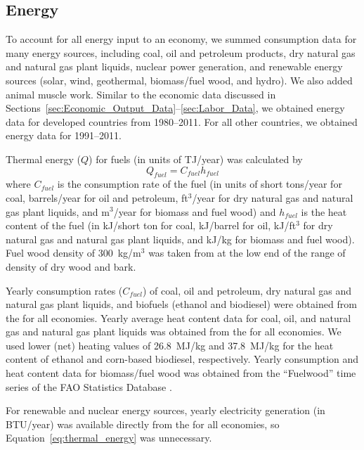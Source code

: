 \documentclass[preprint,authoryear,12pt]{elsarticle}\usepackage[]{graphicx}\usepackage[]{color}
\begin{document}
\subsection{Energy} 
\label{sec:Energy_Data}

To account for all energy input to an economy, we summed consumption data 
for many energy sources, including coal, oil and petroleum products, 
dry natural gas and natural gas plant liquids, nuclear power generation, 
and renewable energy sources (solar, wind, geothermal, biomass/fuel wood, 
and hydro). 
We also added animal muscle work. 
Similar to the economic data discussed in 
Sections~\ref{sec:Economic_Output_Data}--\ref{sec:Labor_Data}, 
we obtained energy data for developed countries from 1980--2011. 
For all other countries, 
we obtained energy data for 1991--2011. 

Thermal energy ($Q$) for fuels (in units of TJ/year) was calculated by
%
\begin{equation} \label{eq:thermal_energy}
  Q_{fuel} = C_{fuel}h_{fuel}
\end{equation}
%
\noindent where $C_{fuel}$ is the consumption rate of the fuel 
(in units of short tons/year for coal, barrels/year for oil and petroleum, 
ft$^3$/year for dry natural gas and natural gas plant liquids, 
and m$^3$/year for biomass and fuel wood) and $h_{{fuel}}$ is 
the heat content of the fuel (in kJ/short ton for coal, kJ/barrel for oil, 
kJ/ft$^3$ for dry natural gas and natural gas plant liquids, 
and kJ/kg for biomass and fuel wood). 
Fuel wood density of 300~kg/m$^3$ 
was taken from \citet{Ragland:2013wp} at the low end of the range 
of density of dry wood and bark.

Yearly consumption rates ($C_{fuel}$) of coal, oil and petroleum, 
dry natural gas and natural gas plant liquids, and biofuels 
(ethanol and biodiesel) were obtained from the \citet{EIA:2013a} 
for all economies. 
Yearly average heat content data for coal, oil, 
and natural gas and natural gas plant liquids was obtained from the 
\citet{EIA:2013a} for all economies. 
We used lower (net) heating values of 
26.8~MJ/kg \citep[Table~A-27]{Cengel:2011ww} and 37.8~MJ/kg 
\citep[Table~7.3]{Gupta:2010vg} for the heat content of ethanol 
and corn-based biodiesel, respectively. 
Yearly consumption and 
heat content data for biomass/fuel wood was obtained from the 
``Fuelwood'' time series of the FAO Statistics Database 
\citep{FAO:2013a}.

For renewable and nuclear energy sources, yearly electricity 
generation (in BTU/year) was available directly from 
the \citet{EIA:2013a} for all economies, so 
Equation~\ref{eq:thermal_energy} was unnecessary.
\end{document}
